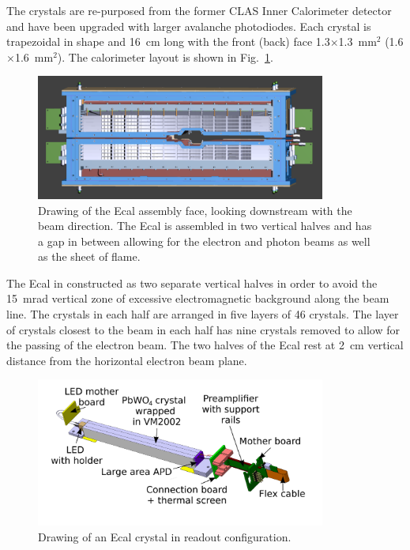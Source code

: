 \documentclass[12pt]{report}
\begin{document}
The crystals are re-purposed from the former CLAS Inner Calorimeter detector and have been upgraded with larger avalanche photodiodes. Each crystal is trapezoidal in shape and 16~cm long with the front (back) face 1.3$\times$1.3~mm$^2$ (1.6$\times$1.6~mm$^2$). The calorimeter layout is shown in Fig.~\ref{Figure:ecalface}. 

\begin{figure}[thb]
  \centering
      \includegraphics[width=0.85\textwidth]{pics/experiment/ecalface.png}
  \caption[Drawing of the Ecal assembly face]{Drawing of the Ecal assembly face, looking downstream with the beam direction. The Ecal is assembled in two vertical halves and has a gap in between allowing for the electron and photon beams as well as the sheet of flame.}
  \label{Figure:ecalface}
\end{figure}

The Ecal in constructed as two separate vertical halves in order to avoid the 15~mrad vertical zone of excessive electromagnetic background along the beam line. The crystals in each half are arranged in five layers of 46 crystals. The layer of crystals closest to the beam in each half has nine crystals removed to allow for the passing of the electron beam. The two halves of the Ecal rest at 2~cm vertical distance from the  horizontal electron beam plane.

\begin{figure}[thb]
  \centering
      \includegraphics[width=0.85\textwidth]{pics/experiment/crystal.png}
  \caption[Single Ecal module]{Drawing of an Ecal crystal in readout configuration.}
  \label{Figure:crystal}
\end{figure}
\end{document}
